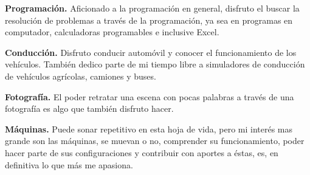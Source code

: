 
\begin{cvparagraph}
\textbf{Programación.} Aficionado a la programación en general, disfruto el buscar la resolución de problemas a través de la programación, ya sea en programas en computador, calculadoras programables e inclusive Excel.\par
\textbf{Conducción.} Disfruto conducir automóvil y conocer el funcionamiento de los vehículos. También dedico parte de mi tiempo libre a simuladores de conducción de vehículos agrícolas, camiones y buses.\par
\textbf{Fotografía.} El poder retratar una escena con pocas palabras a través de una fotografía es algo que también disfruto hacer.\par
\textbf{Máquinas.} Puede sonar repetitivo en esta hoja de vida, pero mi interés mas grande son las máquinas, se muevan o no, comprender su funcionamiento, poder hacer parte de sus configuraciones y contribuir con aportes a éstas, es, en definitiva lo que más me apasiona.\par
\end{cvparagraph}
